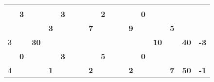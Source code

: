 \documentclass[a4paper, 12pt]{article}
\begin{document}
\begin{table}[H]
\begin{tabular}{|c|cccc|cccc|cccc|cccc|rr|}
          &       & \multicolumn{2}{c}{} &       &       & \multicolumn{2}{c}{} &       &       & \multicolumn{2}{c}{} &       &       & \multicolumn{2}{c}{} &       & \multicolumn{1}{c|}{} &  \bigstrut[b]\\
\cline{2-2}\cline{6-6}\cline{10-10}\cline{14-14}          & \multicolumn{1}{c|}{\textbf{3}} &       &       &       & \multicolumn{1}{c|}{\textbf{3}} &       &       &       & \multicolumn{1}{c|}{\textbf{2}} &       &       &       & \multicolumn{1}{c|}{\textbf{0}} & \multicolumn{2}{c}{} &       & \multicolumn{1}{c|}{} &  \bigstrut\\
    \hline
    \multirow{4}[6]{*}{3} &       &       & \multicolumn{1}{r|}{} & \cellcolor[rgb]{ 1,  .753,  0}\textbf{3} &       &       & \multicolumn{1}{r|}{} & \textbf{7} &       & \multicolumn{2}{c|}{} & \textbf{9} &       &       & \multicolumn{1}{r|}{} & \cellcolor[rgb]{ 1,  .753,  0}\textbf{5} & \multicolumn{1}{c|}{\multirow{4}[6]{*}{\textbf{40}}} & \multicolumn{1}{c|}{\multirow{4}[6]{*}{\textbf{-3}}} \bigstrut\\
\cline{5-5}\cline{9-9}\cline{13-13}\cline{17-17}          &       & \multicolumn{2}{c}{\multirow{2}[2]{*}{\textbf{30}}} &       &       & \multicolumn{2}{c}{\multirow{2}[2]{*}{}} & \multirow{3}[4]{*}{} &       & \multicolumn{2}{c}{\multirow{2}[2]{*}{}} &       &       & \multicolumn{2}{c}{\multirow{2}[2]{*}{\textbf{10}}} &       & \multicolumn{1}{c|}{} &  \bigstrut[t]\\
          &       & \multicolumn{2}{c}{} &       &       & \multicolumn{2}{c}{} &       &       & \multicolumn{2}{c}{} &       &       & \multicolumn{2}{c}{} &       & \multicolumn{1}{c|}{} &  \bigstrut[b]\\
\cline{2-2}\cline{6-6}\cline{10-10}\cline{14-14}          & \multicolumn{1}{c|}{\textbf{0}} & \multicolumn{2}{c}{} &       & \multicolumn{1}{c|}{\textbf{3}} & \multicolumn{2}{c}{} &       & \multicolumn{1}{c|}{\textbf{5}} &       &       &       & \multicolumn{1}{c|}{\textbf{0}} & \multicolumn{2}{c}{} &       & \multicolumn{1}{c|}{} &  \bigstrut\\
    \hline
    \multirow{4}[6]{*}{4} &       &       & \multicolumn{1}{r|}{} & \cellcolor[rgb]{ 1,  .753,  0}\textbf{1} &       &       & \multicolumn{1}{r|}{} & \cellcolor[rgb]{ 1,  .753,  0}\textbf{2} &       &       & \multicolumn{1}{r|}{} & \cellcolor[rgb]{ 1,  .753,  0}\textbf{2} &       &       & \multicolumn{1}{r|}{} & \textbf{7} & \multicolumn{1}{c|}{\multirow{4}[6]{*}{\textbf{50}}} & \multicolumn{1}{c|}{\multirow{4}[6]{*}{\textbf{-1}}} \bigstrut\\

\end{tabular}
\end{table}
\end{document}
